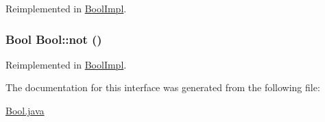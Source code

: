 Reimplemented in \hyperlink{classBoolImpl_a0}{Bool\-Impl}.\hypertarget{interfaceBool_a1}{
\subsubsection[not]{\setlength{\rightskip}{0pt plus 5cm}Bool Bool::not ()}}
\label{interfaceBool_a1}




Reimplemented in \hyperlink{classBoolImpl_a1}{Bool\-Impl}.

The documentation for this interface was generated from the following file:\begin{CompactItemize}
\item 
\hyperlink{Bool_8java-source}{Bool.java}\end{CompactItemize}
